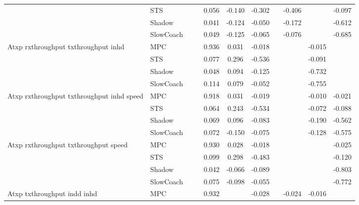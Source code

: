 \begin{tabular}{|l|l|*{9}{c|}}
                              & STS &       &        &     0.056 & -0.140 & -0.302 &     &  -0.406 &      &   -0.097 \\
                              & Shadow &       &        &     0.041 & -0.124 & -0.050 &     &  -0.172 &      &   -0.612 \\
                              & SlowCoach &       &        &     0.049 & -0.125 & -0.065 &     &  -0.076 &      &   -0.685 \\
\midrule
Atxp rxthroughput txthroughput inhd    & MPC &       &        &     0.936 &  0.031 & -0.018 &     &      &  -0.015 &       \\
                              & STS &       &        &     0.077 &  0.296 & -0.536 &     &      &  -0.091 &       \\
                              & Shadow &       &        &     0.048 &  0.094 & -0.125 &     &      &  -0.732 &       \\
                              & SlowCoach &       &        &     0.114 &  0.079 & -0.052 &     &      &  -0.755 &       \\
\midrule
Atxp rxthroughput txthroughput inhd speed    & MPC &       &        &     0.918 &  0.031 & -0.019 &     &      &  -0.010 &   -0.021 \\
                              & STS &       &        &     0.064 &  0.243 & -0.534 &     &      &  -0.072 &   -0.088 \\
                              & Shadow &       &        &     0.069 &  0.096 & -0.083 &     &      &  -0.190 &   -0.562 \\
                              & SlowCoach &       &        &     0.072 & -0.150 & -0.075 &     &      &  -0.128 &   -0.575 \\
\midrule
Atxp rxthroughput txthroughput speed    & MPC &       &        &     0.930 &  0.028 & -0.018 &     &      &      &   -0.025 \\
                              & STS &       &        &     0.099 &  0.298 & -0.483 &     &      &      &   -0.120 \\
                              & Shadow &       &        &     0.042 & -0.066 & -0.089 &     &      &      &   -0.803 \\
                              & SlowCoach &       &        &     0.075 & -0.098 & -0.055 &     &      &      &   -0.772 \\
\midrule
Atxp txthroughput indd inhd    & MPC &       &        &     0.932 &     & -0.028 &     &  -0.024 &  -0.016 &       \\

\end{tabular}
